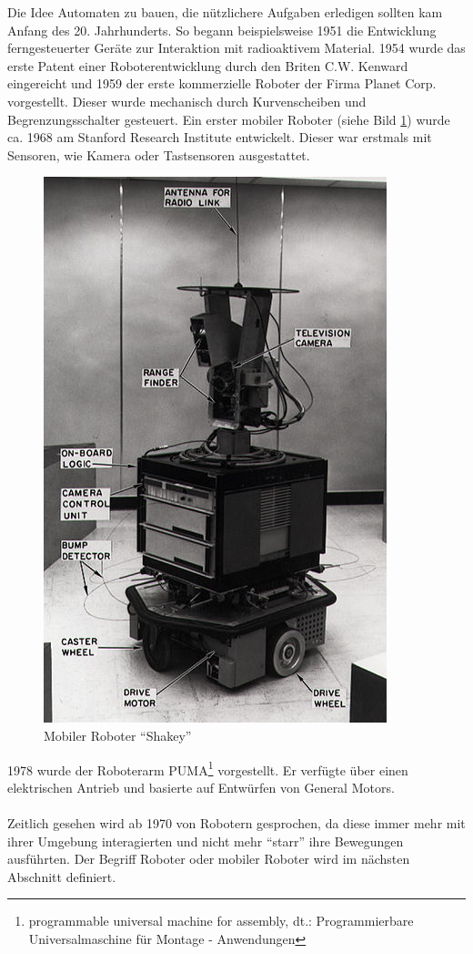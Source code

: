 Die Idee Automaten zu bauen, die nützlichere Aufgaben erledigen sollten kam Anfang des 20. Jahrhunderts. So begann beispielsweise 1951 die Entwicklung ferngesteuerter Geräte zur Interaktion mit radioaktivem Material. 1954 wurde das erste Patent einer Roboterentwicklung durch den Briten C.W. Kenward eingereicht und 1959 der erste kommerzielle Roboter der Firma Planet Corp. vorgestellt. Dieser wurde mechanisch durch Kurvenscheiben und Begrenzungsschalter gesteuert. Ein erster mobiler Roboter (siehe Bild \ref{f:shakey}) wurde ca. 1968 am Stanford Research Institute entwickelt. Dieser war erstmals mit Sensoren, wie Kamera oder Tastsensoren ausgestattet.
\begin{figure}[H]						
	\centering							
	\includegraphics[scale=1]{Bilder/shakey.jpg}			
	\caption{Mobiler Roboter "`Shakey"'}						
	\label{f:shakey}						
\end{figure}
1978 wurde der Roboterarm PUMA\footnote{programmable universal machine for assembly, dt.: Programmierbare Universalmaschine für Montage - Anwendungen} vorgestellt. Er verfügte über einen elektrischen Antrieb und basierte auf Entwürfen von General Motors.
\\
\\
Zeitlich gesehen wird ab 1970 von Robotern gesprochen, da diese immer mehr mit ihrer Umgebung interagierten und nicht mehr "`starr"' ihre Bewegungen ausführten. Der Begriff Roboter oder mobiler Roboter wird im nächsten Abschnitt definiert.
 
